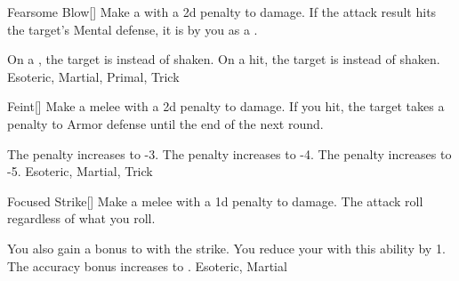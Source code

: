 \lowercase{\hypertarget{maneuver:Fearsome Blow}{}}\label{maneuver:Fearsome Blow}
\hypertarget{maneuver:Fearsome Blow}{}
\begin{freeability}[Rank 3]{Fearsome Blow}[]
Make a  with a \minus2d penalty to damage.
If the attack result hits the target's Mental defense,
it is  by you as a .

\rankline
{} On a , the target is  instead of shaken.
 On a hit, the target is  instead of shaken.
 Esoteric, Martial, Primal, Trick
\end{freeability}
\vspace{0.25em}



\lowercase{\hypertarget{maneuver:Feint}{}}\label{maneuver:Feint}
\hypertarget{maneuver:Feint}{}
\begin{freeability}[Rank 1]{Feint}[]
Make a melee  with a \minus2d penalty to damage.
If you hit, the target takes a  penalty to Armor defense until the end of the next round.

\rankline
{} The penalty increases to -3.
 The penalty increases to -4.
 The penalty increases to -5.
 Esoteric, Martial, Trick
\end{freeability}
\vspace{0.25em}



\lowercase{\hypertarget{maneuver:Focused Strike}{}}\label{maneuver:Focused Strike}
\hypertarget{maneuver:Focused Strike}{}
\begin{freeability}[Rank 1]{Focused Strike}[]
Make a melee  with a \minus1d penalty to damage.
The attack roll  regardless of what you roll.

\rankline
{} You also gain a  bonus to  with the strike.
 You reduce your  with this ability by 1.
 The accuracy bonus increases to .
 Esoteric, Martial
\end{freeability}
\vspace{0.25em}



